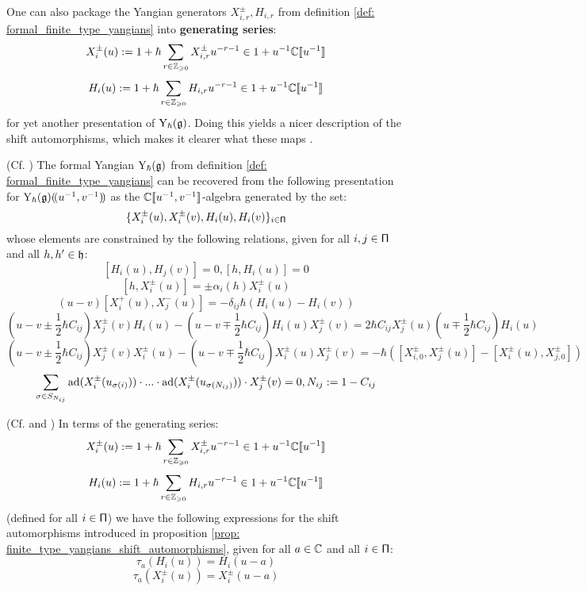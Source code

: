         One can also package the Yangian generators $X_{i, r}^{\pm}, H_{i, r}$ from definition \ref{def: formal_finite_type_yangians} into \textbf{generating  series}:
            $$X_i^{\pm}(u) := 1 + \hbar \sum_{r \in \mathbb{Z}_{\geqslant 0}} X_{i, r}^{\pm} u^{-r - 1} \in 1 + u^{-1} \mathbb{C}[\![u^{-1}]\!]$$
            $$H_i(u) := 1 + \hbar \sum_{r \in \mathbb{Z}_{\geqslant 0}} H_{i, r} u^{-r - 1} \in 1 + u^{-1} \mathbb{C}[\![u^{-1}]\!]$$
        for yet another presentation of $\mathrm{Y}_{\hbar}(\mathfrak{g})$. Doing this yields a nicer description of the shift automorphisms, which makes it clearer what these maps . 
        \begin{proposition} \label{prop: generating_series_for_finite_untwisted_yangians}
            (Cf. \cite[Proposition 2.3]{gautam_and_toledano_laredo_yangians_quantum_loop_algebras_and_abelian_difference_equations}) The formal Yangian $\mathrm{Y}_{\hbar}(\mathfrak{g})$ from definition \ref{def: formal_finite_type_yangians} can be recovered from the following presentation for $\mathrm{Y}_{\hbar}(\mathfrak{g})(\!(u^{-1}, v^{-1})\!)$ as the $\mathbb{C}[\![u^{-1}, v^{-1}]\!]$-algebra generated by the set:
                $$\{X_i^{\pm}(u), X_i^{\pm}(v), H_i(u), H_i(v)\}_{i \in \mathsf{\Pi}}$$
            whose elements are constrained by the following relations, given for all $i, j \in \mathsf{\Pi}$ and all $h, h' \in \mathfrak{h}$:
                $$[H_i(u), H_j(v)] = 0, [h, H_i(u)] = 0$$
                $$[h, X_i^{\pm}(u)] = \pm \alpha_i(h) X_i^{\pm}(u)$$
                $$(u - v) [X_i^+(u), X_j^-(u)] = -\delta_{ij} \hbar ( H_i(u) - H_i(v) )$$
                $$\left(u - v \pm \frac12 \hbar C_{ij}\right) X_j^{\pm}(v) H_i(u) - \left(u - v \mp  \frac12 \hbar C_{ij}\right) H_i(u) X_j^{\pm}(v) = 2 \hbar C_{ij} X_j^{\pm}(u) \left(u \mp \frac12 \hbar C_{ij}\right) H_i(u)$$
                $$\left(u - v \pm \frac12 \hbar C_{ij}\right) X_j^{\pm}(v) X_i^{\pm}(u) - \left(u - v \mp \frac12 \hbar C_{ij}\right) X_i^{\pm}(u) X_j^{\pm}(v) = -\hbar( [X_{i, 0}^{\pm}, X_j^{\pm}(u)] - [X_i^{\pm}(u), X_{j, 0}^{\pm}] )$$
                $$\sum_{\sigma \in S_{N_{ij}}} \mathrm{ad}( X_i^{\pm}( u_{\sigma(i)} ) ) \cdot ... \cdot \mathrm{ad}( X_i^{\pm}( u_{\sigma(N_{ij})} ) ) \cdot X_j^{\pm}(v) = 0, N_{ij} := 1 - C_{ij}$$
        \end{proposition}
        \begin{proposition} \label{prop: shift_automorphisms_via_generating_series}
            (Cf. \cite[Subsection 2.8]{gautam_and_toledano_laredo_yangians_quantum_loop_algebras_and_abelian_difference_equations} and \cite[Remark 2.4]{wendlandt_formal_shift_operators_on_yangian_doubles}) In terms of the generating series:
                $$X_i^{\pm}(u) := 1 + \hbar \sum_{r \in \mathbb{Z}_{\geqslant 0}} X_{i, r}^{\pm} u^{-r - 1} \in 1 + u^{-1} \mathbb{C}[\![u^{-1}]\!]$$
                $$H_i(u) := 1 + \hbar \sum_{r \in \mathbb{Z}_{\geqslant 0}} H_{i, r} u^{-r - 1} \in 1 + u^{-1} \mathbb{C}[\![u^{-1}]\!]$$
            (defined for all $i \in \mathsf{\Pi}$) we have the following expressions for the shift automorphisms introduced in proposition \ref{prop: finite_type_yangians_shift_automorphisms}, given for all $a \in \mathbb{C}$ and all $i \in \mathsf{\Pi}$:
                $$\tau_a(H_i(u)) = H_i(u - a)$$
                $$\tau_a(X_i^{\pm}(u)) = X_i^{\pm}(u - a)$$
        \end{proposition}
